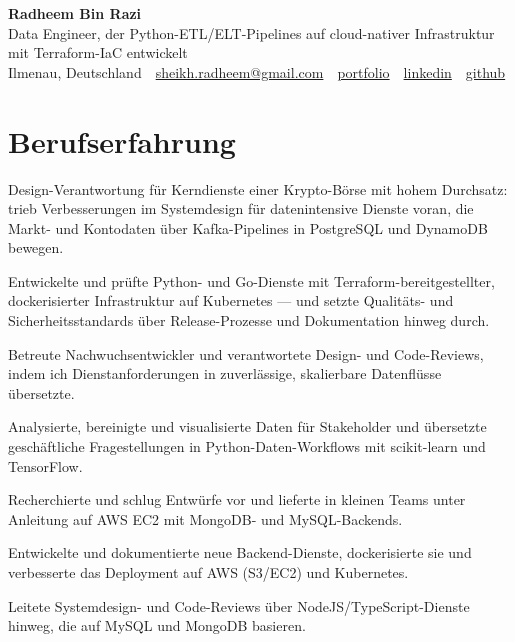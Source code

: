 \documentclass[11pt,a4paper]{resume}
\makeatletter
\newcommand{\Portfolio}{https://radheem.github.io/my-cv}
\newcommand{\PortfolioText}{portfolio}
\newcommand{\GitHub}{https://github.com/radheem}
\newcommand{\LinkedIn}{https://www.linkedin.com/in/radheem-razi}
\newcommand{\Email}{sheikh.radheem@gmail.com}
\makeatother
\begin{document}
\clearpage
{}

\begin{center}
  {\huge\bfseries Radheem Bin Razi}\\[3pt]
  {\large Data Engineer, der Python-ETL/ELT-Pipelines auf cloud-nativer Infrastruktur mit Terraform-IaC entwickelt}\\[6pt]
  \small
  Ilmenau, Deutschland \,\textbar\,
  \href{mailto:\Email}{\Email} \,\textbar\,
  \href{\Portfolio}{\PortfolioText} \,\textbar\,
  \href{\LinkedIn}{linkedin} \,\textbar\,
  \href{\GitHub}{github}
\end{center}
\vspace{2pt}

\section{Berufserfahrung}

\bullets
  \item Design-Verantwortung für Kerndienste einer Krypto-Börse mit hohem Durchsatz: trieb Verbesserungen im Systemdesign für datenintensive Dienste voran, die Markt- und Kontodaten über Kafka-Pipelines in PostgreSQL und DynamoDB bewegen.
  \item Entwickelte und prüfte Python- und Go-Dienste mit Terraform-bereitgestellter, dockerisierter Infrastruktur auf Kubernetes — und setzte Qualitäts- und Sicherheitsstandards über Release-Prozesse und Dokumentation hinweg durch.
  \item Betreute Nachwuchsentwickler und verantwortete Design- und Code-Reviews, indem ich Dienstanforderungen in zuverlässige, skalierbare Datenflüsse übersetzte.
\bulletsend
\vspace{3pt}
\bullets
  \item Analysierte, bereinigte und visualisierte Daten für Stakeholder und übersetzte geschäftliche Fragestellungen in Python-Daten-Workflows mit scikit-learn und TensorFlow.
  \item Recherchierte und schlug Entwürfe vor und lieferte in kleinen Teams unter Anleitung auf AWS EC2 mit MongoDB- und MySQL-Backends.
\bulletsend
\vspace{3pt}
\bullets
  \item Entwickelte und dokumentierte neue Backend-Dienste, dockerisierte sie und verbesserte das Deployment auf AWS (S3/EC2) und Kubernetes.
  \item Leitete Systemdesign- und Code-Reviews über NodeJS/TypeScript-Dienste hinweg, die auf MySQL und MongoDB basieren.
\bulletsend
\vspace{3pt}
\end{document}
